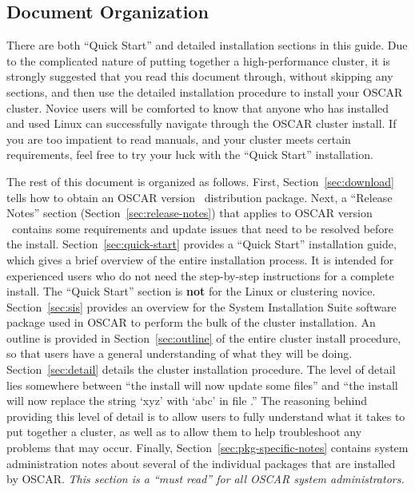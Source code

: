 \endchange


\subsection{Document Organization}

There are both ``Quick Start'' and detailed installation sections in
this guide. Due to the complicated nature of putting together a
high-performance cluster, it is strongly suggested that you read this
document through, without skipping any sections, and then use the
detailed installation procedure to install your OSCAR cluster.  Novice
users will be comforted to know that anyone who has installed and used
Linux can successfully navigate through the OSCAR cluster install.  If
you are too impatient to read manuals, and your cluster meets certain
requirements, feel free to try your luck with the ``Quick Start''
installation.

The rest of this document is organized as follows.  
%
First, Section~\ref{sec:download} tells how to obtain an OSCAR version
\oscarversion\ distribution package.
%
Next, a ``Release Notes'' section (Section~\ref{sec:release-notes})
that applies to OSCAR version \oscarversion\ contains some
requirements and update issues that need to be resolved before the
install.
%
Section~\ref{sec:quick-start} provides a ``Quick Start'' installation
guide, which gives a brief overview of the entire installation
process.  It is intended for experienced users who do not need the
step-by-step instructions for a complete install.  The ``Quick Start''
section is {\bf not} for the Linux or clustering novice.
%
Section~\ref{sec:sis} provides an overview for the System Installation
Suite software package used in OSCAR to perform the bulk of the
cluster installation.
%
An outline is provided in Section~\ref{sec:outline} of the entire
cluster install procedure, so that users have a general understanding
of what they will be doing.
%
Section~\ref{sec:detail} details the cluster installation procedure.
The level of detail lies somewhere between ``the install will now
update some files'' and ``the install will now replace the string
`xyz' with `abc' in file .'' The reasoning behind
providing this level of detail is to allow users to fully understand
what it takes to put together a cluster, as well as to allow them to
help troubleshoot any problems that may occur.
%
Finally, Section~\ref{sec:pkg-specific-notes} contains system
administration notes about several of the individual packages that are
installed by OSCAR.  {\em This section is a ``must read'' for all
  OSCAR system administrators.}

